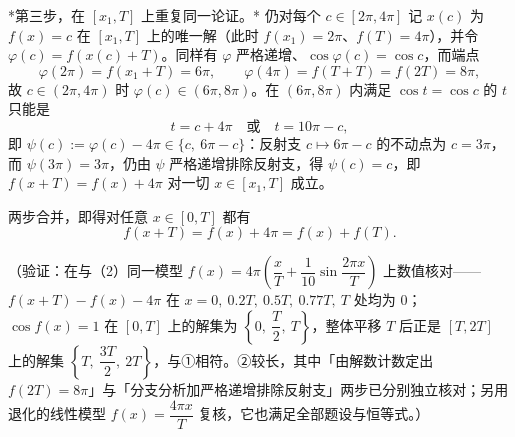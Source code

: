 \begin{answer}
*第三步，在 \([x_{1},T]\) 上重复同一论证。* 仍对每个 \(c\in[2\pi,4\pi]\) 记 \(x(c)\) 为 \(f(x)=c\) 在 \([x_{1},T]\) 上的唯一解（此时 \(f(x_{1})=2\pi\)、\(f(T)=4\pi\)），并令 \(\varphi(c)=f(x(c)+T)\)。同样有 \(\varphi\) 严格递增、\(\cos\varphi(c)=\cos c\)，而端点
\nopagebreak[4]
\[
\varphi(2\pi)=f(x_{1}+T)=6\pi,\qquad\varphi(4\pi)=f(T+T)=f(2T)=8\pi,
\]
故 \(c\in(2\pi,4\pi)\) 时 \(\varphi(c)\in(6\pi,8\pi)\)。在 \((6\pi,8\pi)\) 内满足 \(\cos t=\cos c\) 的 \(t\) 只能是
\nopagebreak[4]
\[
t=c+4\pi\quad\text{或}\quad t=10\pi-c,
\]
即 \(\psi(c):=\varphi(c)-4\pi\in\{c,\ 6\pi-c\}\)：反射支 \(c\mapsto6\pi-c\) 的不动点为 \(c=3\pi\)，而 \(\psi(3\pi)=3\pi\)，仍由 \(\psi\) 严格递增排除反射支，得 \(\psi(c)=c\)，即 \(f(x+T)=f(x)+4\pi\) 对一切 \(x\in[x_{1},T]\) 成立。

两步合并，即得对任意 \(x\in[0,T]\) 都有
\nopagebreak[4]
\[
f(x+T)=f(x)+4\pi=f(x)+f(T).
\]

（验证：在与（2）同一模型 \(f(x)=4\pi\allowbreak\left(\dfrac{x}{T}+\dfrac{1}{10}\sin\dfrac{2\pi x}{T}\right)\) 上数值核对——\(f(x+T)-f(x)-4\pi\) 在 \(x=0,\ 0.2T,\ 0.5T,\ 0.77T,\ T\) 处均为 \(0\)；\(\cos f(x)=1\) 在 \([0,T]\) 上的解集为 \(\left\{0,\ \dfrac{T}{2},\ T\right\}\)，整体平移 \(T\) 后正是 \([T,2T]\) 上的解集 \(\left\{T,\ \dfrac{3T}{2},\ 2T\right\}\)，与①相符。②较长，其中「由解数计数定出 \(f(2T)=8\pi\)」与「分支分析加严格递增排除反射支」两步已分别独立核对；另用退化的线性模型 \(f(x)=\dfrac{4\pi x}{T}\) 复核，它也满足全部题设与恒等式。）




\end{answer}
